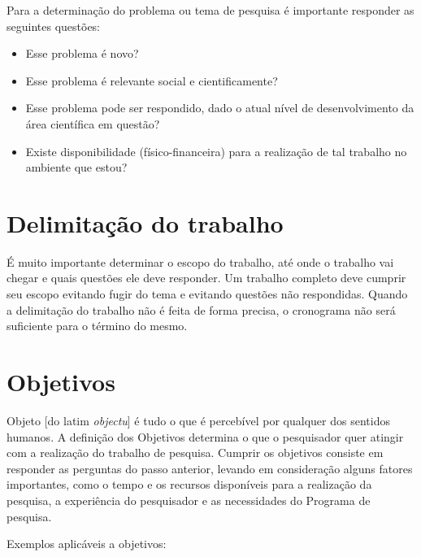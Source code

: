 Para a determinação do problema ou tema de pesquisa é importante responder as seguintes questões:
	
\begin{itemize}
\item Esse problema é novo?
\item Esse problema é relevante social e cientificamente?
\item Esse problema pode ser respondido, dado o atual nível de desenvolvimento da área científica em questão?
\item Existe disponibilidade (físico-financeira) para a realização de tal trabalho no ambiente que estou?	\end{itemize}
	

\section{Delimitação do trabalho}

É muito importante determinar o escopo do trabalho, até onde o trabalho vai chegar e quais questões ele deve responder. Um trabalho completo deve cumprir seu escopo evitando fugir do tema e evitando questões não respondidas. Quando a delimitação do trabalho não é feita de forma precisa, o cronograma não será suficiente para o término do mesmo.


\section{Objetivos}

Objeto [do latim \textit{objectu}] é tudo o que é percebível por qualquer dos sentidos humanos. A definição dos Objetivos determina o que o pesquisador quer atingir com a realização do trabalho de pesquisa. Cumprir os objetivos consiste em responder as perguntas do passo anterior, levando em consideração alguns fatores importantes, como o tempo e os recursos disponíveis para a realização da pesquisa, a experiência do pesquisador e as necessidades do Programa de pesquisa.


Exemplos aplicáveis a objetivos:

